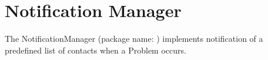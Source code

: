 \section{Notification Manager}
\renewcommand{\gocurpackage}{notifier}

The NotificationManager (package name: ) implements notification of a predefined list of contacts when a Problem occurs.
